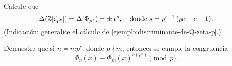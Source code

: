 \begin{ejercicio}
  Calcule que
  \[ \Delta (\mathbb{Z} [\zeta_{p^e}]) = \Delta (\Phi_{p^e}) = \pm\,p^s,
     \quad \text{donde } s = p^{e-1}\,(pe - e - 1). \]
  (Indicación: generalice el cálculo de
  \ref{ejemplo:discriminante-de-Q-zeta-p}.)
\end{ejercicio}

\begin{ejercicio}
  Demuestre que si $n = m p^e$, donde $p \nmid m$, entonces se cumple
  la congruencia
  $$\Phi_n (x) \equiv \Phi_m (x)^{\phi (p^e)} \pmod{p}.$$
\end{ejercicio}
